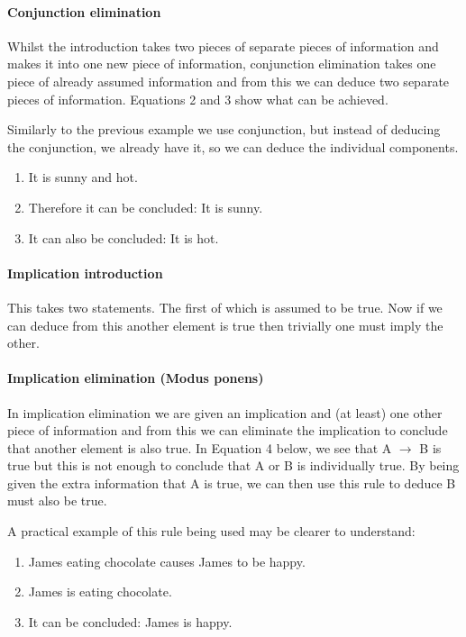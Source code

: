 \documentclass[a4paper]{article}
\begin{document}
\paragraph{Conjunction elimination}

Whilst the introduction takes two pieces of separate pieces of information and makes it into one new piece of information, conjunction elimination takes one piece of already assumed information and from this we can deduce two separate pieces of information. Equations 2 and 3 show what can be achieved.

\bigskip \centerline{}
\bigskip
\centerline{}
\bigskip
Similarly to the previous example we use conjunction, but instead of deducing the conjunction, we already have it, so we can deduce the individual components.
\begin{enumerate}
\item{It is sunny and hot.}
\item{Therefore it can be concluded: It is sunny.}
\item{It can also be concluded: It is hot.}
\end{enumerate}

\paragraph{Implication introduction}
This takes two statements. The first of which is assumed to be true. Now if we can deduce from this another element is true then trivially one must imply the other. 

\bigskip \centerline{}
\bigskip

\paragraph{Implication elimination (Modus ponens)}

In implication elimination we are given an implication and (at least) one other piece of information and from this we can eliminate the implication to conclude that another element is also true. In Equation 4 below, we see that A $\rightarrow$ B is true but this is not enough to conclude that A or B is individually true. By being given the extra information that A is true, we can then use this rule to deduce B must also be true. 

\bigskip \centerline{}
\bigskip
A practical example of this rule being used may be clearer to understand:
\begin{enumerate}
\item{James eating chocolate causes James to be happy.}
\item{James is eating chocolate.}
\item{It can be concluded:  James is happy.}
\end{enumerate}
\end{document}
